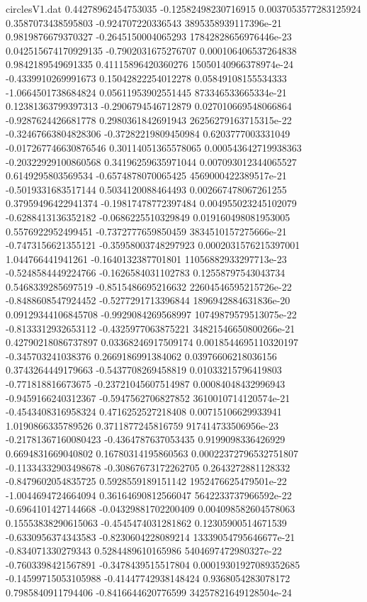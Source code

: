 \begin{filecontents}{circlesV1.dat}
0.44278962454753035	-0.12582498230716915	0.0037053577283125924
0.3587073438595803	-0.924707220336543	3895358939117396e-21
0.9819876679370327	-0.2645150004065293	17842828656976446e-23
0.042515674170929135	-0.7902031675276707	0.000106406537264838
0.9842189549691335	0.41115896420360276	15050140966378974e-24
-0.4339910269991673	0.15042822254012278	0.05849108155534333
-1.0664501738684824	0.05611953902551445	873346533665334e-21
0.12381363799397313	-0.2906794546712879	0.027010669548066864
-0.9287624426681778	0.2980361842691943	26256279163715315e-22
-0.32467663804828306	-0.37282219809450984	0.6203777003331049
-0.017267746630876546	0.30114051365578065	0.000543642719938363
-0.20322929100860568	0.34196259635971044	0.007093012344065527
0.6149295803569534	-0.6574878070065425	4569000422389517e-21
-0.5019331683517144	0.5034120088464493	0.002667478067261255
0.37959496422941374	-0.19817478772397484	0.004955023245102079
-0.6288413136352182	-0.0686225510329849	0.019160498081953005
0.5576922952499451	-0.7372777659850459	3834510157275666e-21
-0.7473156621355121	-0.35958003748297923	0.0002031576215397001
1.044766441941261	-0.1640132387701801	11056882933297713e-23
-0.5248584449224766	-0.1626584031102783	0.12558797543043734
0.5468339285697519	-0.8515486695216632	22604546595215726e-22
-0.8488608547924452	-0.5277291713396844	1896942884631836e-20
0.09129344106845708	-0.9929084269568997	10749879579513075e-22
-0.8133312932653112	-0.4325977063875221	34821546650800266e-21
0.42790218086737897	0.03368246917509174	0.0018544695110320197
-0.345703241038376	0.2669186991384062	0.03976606218036156
0.3743264449179663	-0.5437708269458819	0.01033215796419803
-0.771818816673675	-0.23721045607514987	0.00084048432996943
-0.9459166240312367	-0.5947562706827852	3610010714120574e-21
-0.4543408316958324	0.4716252527218408	0.00715106629933941
1.0190866335789526	0.3711877245816759	917414733506956e-23
-0.21781367160080423	-0.4364787637053435	0.9199098336426929
0.6694831669040802	0.16780314195860563	0.00022372796532751807
-0.11334332903498678	-0.30867673172262705	0.2643272881128332
-0.8479602054835725	0.5928559189151142	1952476625479501e-22
-1.0044694724664094	0.36164690812566047	5642233737966592e-22
-0.6964101427144668	-0.04329881702200409	0.004098582604578063
0.15553838290615063	-0.4545474031281862	0.12305900514671539
-0.6330956374343583	-0.8230604228089214	13339054795646677e-21
-0.834071330279343	0.5284489610165986	5404697472980327e-22
-0.7603398421567891	-0.3478439515517804	0.00019301927089352685
-0.14599715053105988	-0.41447742938148424	0.9368054283078172
0.7985840911794406	-0.8416644620776599	34257821649128504e-24

\end{filecontents}
